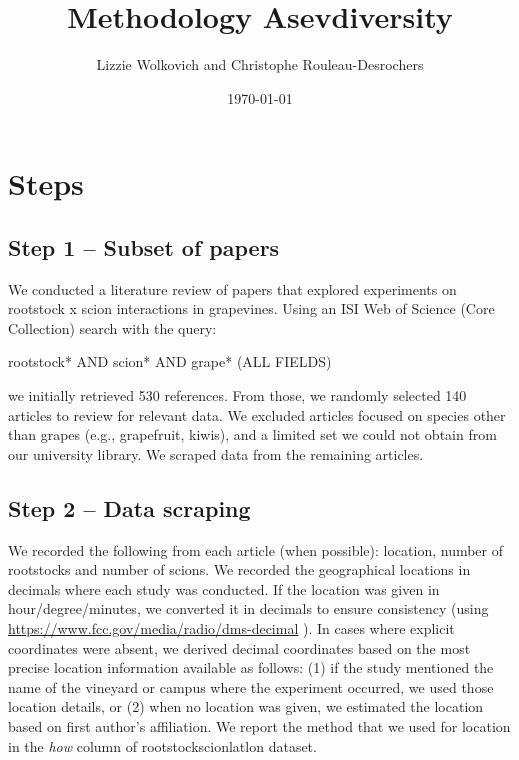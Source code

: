 \documentclass[11pt, oneside]{article}   	%
\title{Methodology Asevdiversity}
\author{Lizzie Wolkovich and Christophe Rouleau-Desrochers}
\date{\today}
\begin{document}
\maketitle
\section{Steps}
\subsection{Step 1 – Subset of papers}
We conducted a literature review of papers that explored experiments on rootstock x scion interactions in grapevines. Using an ISI Web of Science (Core Collection) search with the query:

rootstock* AND scion* AND grape* (ALL FIELDS)

we initially retrieved 530 references. From those, we randomly selected 140 articles to review for relevant data. We excluded articles focused on species other than grapes (e.g., grapefruit, kiwis), and a limited set we could not obtain from our university library. We scraped data from the remaining articles.

\subsection{Step 2 – Data scraping}

We recorded the following from each article (when possible): location, number of rootstocks and number of scions. We recorded the geographical locations in decimals where each study was conducted. If the location was given in hour/degree/minutes, we converted it in decimals to ensure consistency (using \url{https://www.fcc.gov/media/radio/dms-decimal} ). In cases where explicit coordinates were absent, we derived decimal coordinates based on the most precise location information available as follows: (1) if the study mentioned the name of the vineyard or campus where the experiment occurred, we used those location details, or (2) when no location was given, we estimated the location based on first author’s affiliation. We report the method that we used for location in the \emph{how} column of rootstockscionlatlon dataset. %
\end{document}
